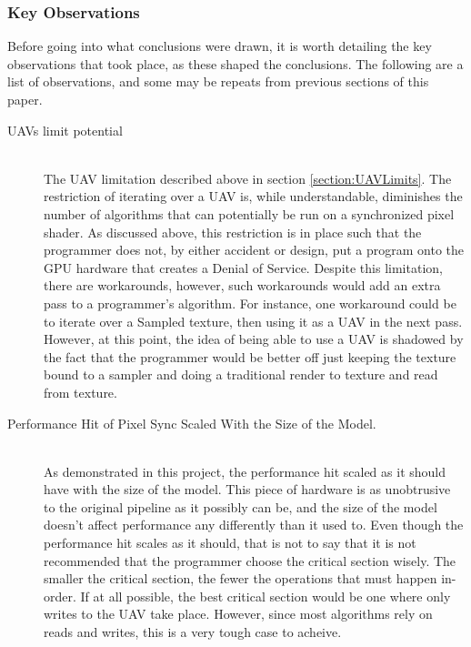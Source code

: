 \documentclass[a4paper, 12pt]{article}
\begin{document}
\subsubsection{Key Observations}

Before going into what conclusions were drawn, it is worth detailing the key
observations that took place, as these shaped the conclusions. The following
are a list of observations, and some may be repeats from previous sections of
this paper.

\begin{description}

\item[UAVs limit potential] \hfill \\

The UAV limitation described above in section \ref{section:UAVLimits}. The
restriction of iterating over a UAV is, while understandable, diminishes the
number of algorithms that can potentially be run on a synchronized pixel
shader. As discussed above, this restriction is in place such that the
programmer does not, by either accident or design, put a program onto the GPU
hardware that creates a Denial of Service. Despite this limitation, there are
workarounds, however, such workarounds would add an extra pass to a
programmer's algorithm. For instance, one workaround could be to iterate over
a Sampled texture, then using it as a UAV in the next pass. However, at this
point, the idea of being able to use a UAV is shadowed by the fact that the
programmer would be better off just keeping the texture bound to a sampler and
doing a traditional render to texture and read from texture.

\item[Performance Hit of Pixel Sync Scaled With the Size of the Model.] \hfill \\

As demonstrated in this project, the performance hit scaled as it should have
with the size of the model. This piece of hardware is as unobtrusive to the
original pipeline as it possibly can be, and the size of the model doesn't
affect performance any differently than it used to. Even though the
performance hit scales as it should, that is not to say that it is not
recommended that the programmer choose the critical section wisely. The
smaller the critical section, the fewer the operations that must happen in-
order. If at all possible, the best critical section would be one where only
writes to the UAV take place. However, since most algorithms rely on reads and
writes, this is a very tough case to acheive.


\end{description}
\end{document}
